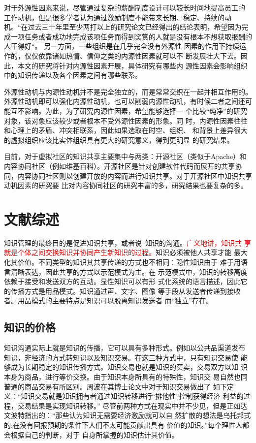 \documentclass[12pt,a4paper]{ctexart}
\begin{document}
对于外源性因素来说，尽管通过复杂的薪酬制度设计可以较长时间地提高员工的
工作动机，但是很多学者认为通过激励制度不能带来长期、稳定、持续的动机。“在过去三十年里至少两打以上的研究论文已经得出的结论表明，希望因为完成一项任务或者成功地完成该项任务而得到奖赏的人就是没有根本不想获取报酬的人干得好“\cite{93120316461993}。
另一方面，一些组织是在几乎完全没有外源性
因素的作用下持续运作的，仅仅依靠诸如热情、信仰之类的内源性因素就可以不
断发展壮大下去。因此，本文的研究将针对内源性因素开展，具体研究有哪些内
源性因素会影响组织中的知识传递以及各个因素之间有哪些联系。

外源性动机与内源性动机并不是完全独立的，而是常常交织在一起并相互作用的。
外源性动机即可以强化内源性动机，也可以削弱内源性动机，有时候二者之间还可
能互不影响\cite{deci1971eem}。为此，为了研究内源性因素，希望能够选择一
个比较“纯净”的研究对象，该对象应该较少或者根本不受外源性因素的形象。同
时，内源性因素往往和心理上的矛盾、冲突相联系，因此如果选取在时空、组织、
和背景上差异很大的虚拟组织应该比实体组织具有更大的研究意义，得到更明显
的研究结果。

目前，对于虚拟社区的知识共享主要集中与两类：开源社区（类似于Apache）和
内容协同社区（例如维基百科）。开源社区是针对创建软件代码而展开的共享协
同，内容协同社区则以创建开放的内容而进行知识共享。对于开源社区中知识共享动机因素的研究要
比对内容协同社区的研究丰富的多，研究结果也要复杂的多。


\section{文献综述}

知识管理的最终目的是促进知识共享，或者说--知识的沟通。\textcolor{red}{广义地讲，知识共
享就是个体之间交换知识并协同产生新知识的过程。}知识必须被他人共享才能
最大化其价值。不同类型的知识其共享传递的方式也不相同：隐性知识由于
难于用语言清晰表达，因此共享的方式以示范模式为主。在
示范模式中，知识的转移高度依赖于接受和发送双方的互动。\cite{zhoubo2006}显性知识可以有形
式化系统的语言描述，因此它的传播方式是用品模式。知识通过声、文字、图像
等手段从发送者传递到接收者。用品模式的主要特点是知识可以脱离知识发送者
而“独立”存在。\cite{zhoubo2006}

\subsection{知识的价格}

知识沟通实际上就是知识的传播，它可以具有多种形式。例如以公共品渠道发布
知识，非经济的方式转知识以及知识交易。在这三种方式中，只有知识交易使
能够成为长期稳定的知识传播方式。知识交易也就是知识的买卖，交易双方以知
识本身为商品，进行等价交换。由于知识本身所具有的特殊性，知识交
易自然也同普通的商品交易有所区别。周波在其博士论文中对于知识交易做出了
如下定义：“知识交易就是知识拥有者通过知识转移进行“排他性”控制获得经济
利益的过程，交易结果是实现知识转移。”\cite{zhoubo2006}
尽管前两种方式在现实中并不少见，但是正如达
文波特指出的：“那些认为知识无需要经济激励就可以自
然扩散的想法是乌托邦式的;在没有回报预期的条件下人们不太可能贡献出具有
价值的知识。”\cite{davenport1998wko}每个理性人都会根据自己的判断，对于
自身所掌握的知识估计其价值。
\end{document}
